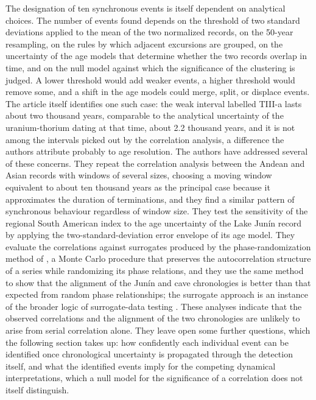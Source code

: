 \documentclass[11pt]{article}
\theoremstyle{definition}
\begin{document}
The designation of ten synchronous events is itself dependent on analytical choices. The number of events found depends on the threshold of two standard deviations applied to the mean of the two normalized records, on the 50-year resampling, on the rules by which adjacent excursions are grouped, on the uncertainty of the age models that determine whether the two records overlap in time, and on the null model against which the significance of the clustering is judged. A lower threshold would add weaker events, a higher threshold would remove some, and a shift in the age models could merge, split, or displace events. The article itself identifies one such case: the weak interval labelled TIII-a lasts about two thousand years, comparable to the analytical uncertainty of the uranium-thorium dating at that time, about 2.2 thousand years, and it is not among the intervals picked out by the correlation analysis, a difference the authors attribute probably to age resolution. The authors have addressed several of these concerns. They repeat the correlation analysis between the Andean and Asian records with windows of several sizes, choosing a moving window equivalent to about ten thousand years as the principal case because it approximates the duration of terminations, and they find a similar pattern of synchronous behaviour regardless of window size. They test the sensitivity of the regional South American index to the age uncertainty of the Lake Junín record by applying the two-standard-deviation error envelope of its age model. They evaluate the correlations against surrogates produced by the phase-randomization method of \citet{ebisuzaki1997}, a Monte Carlo procedure that preserves the autocorrelation structure of a series while randomizing its phase relations, and they use the same method to show that the alignment of the Junín and cave chronologies is better than that expected from random phase relationships; the surrogate approach is an instance of the broader logic of surrogate-data testing \citep{theiler1992}. These analyses indicate that the observed correlations and the alignment of the two chronologies are unlikely to arise from serial correlation alone. They leave open some further questions, which the following section takes up: how confidently each individual event can be identified once chronological uncertainty is propagated through the detection itself, and what the identified events imply for the competing dynamical interpretations, which a null model for the significance of a correlation does not itself distinguish.
\end{document}
